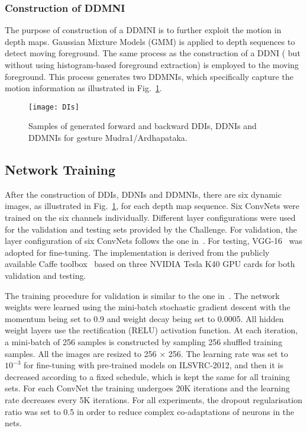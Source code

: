 \documentclass[10pt, a4paper, conference]{IEEEtran}
\begin{document}
\subsubsection{Construction of DDMNI}

The purpose of construction of a DDMNI is to further exploit the motion in depth maps. Gaussian Mixture Models (GMM) is applied to depth sequences to detect moving foreground. The same process as the construction of a DDNI ( but without using histogram-based foreground extraction) is employed to the moving foreground. This process generates two DDMNIs, which specifically capture the motion information as illustrated in Fig.~\ref{fig:DIs}. 


\begin{figure}[t]
\begin{center}{\texttt{[image: DIs]}}
\end{center}
\caption{Samples of generated forward and backward DDIs, DDNIs and DDMNIs for gesture Mudra1/Ardhapataka.}
\label{fig:DIs}
\end{figure}


\subsection{Network Training}
After the construction of DDIs, DDNIs and DDMNIs, there are six dynamic images, as illustrated in Fig.~\ref{fig:DIs}, for each depth map sequence. Six ConvNets were trained on the six channels individually. Different layer configurations were used for the validation and testing sets provided by the Challenge. For validation, the layer configuration of six ConvNets follows the one in~\cite{krizhevsky2012imagenet}.  For testing, VGG-16~\cite{simonyan2014very} was adopted for fine-tuning. The implementation is derived from the publicly available Caffe toolbox~\cite{jia2014caffe} based on three {NVIDIA Tesla K40 GPU} cards for both validation and testing.

The training procedure for validation is similar to the one in~\cite{krizhevsky2012imagenet}. The network weights were learned using the mini-batch stochastic gradient descent with the momentum being set to 0.9 and weight decay being set to 0.0005. All hidden weight layers use the rectification (RELU) activation function. At each iteration, a mini-batch of 256 samples is constructed by sampling 256 shuffled training samples. All the images are resized to 256 $\times$ 256. The learning rate was set to $10^{-3}$ for fine-tuning with pre-trained models on ILSVRC-2012, and then it is decreased according to a fixed schedule, which is kept the same for all training sets. For each ConvNet the training undergoes 20K iterations and the learning rate decreases every 5K iterations. For all experiments, the dropout regularisation ratio was set to 0.5 in order to reduce complex co-adaptations of neurons in the nets.
\end{document}
